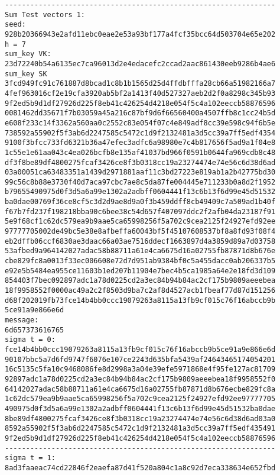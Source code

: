 \documentclass{article}
\begin{document}
 {\footnotesize
 \begin{verbatim}
----------------------------------------------------------------
Sum Test vectors 1:
seed:
928b20366943e2afd11ebc0eae2e53a93bf177a4fcf35bcc64d503704e65e202
h = 7
sum_key VK:
23d72240b54a6135ec7ca96013d2e4edacefc2ccad2aac861430eeb9286b4ae6
sum_key SK
3fcd949fc91c761887d8bcad1c8b1b1565d25d4ffdbfffa28cb66a51982166a7
4fef963016cf2e19cfa3920ab5bf2a1413f40d527327aeb2d2f0a8298c345b93
9f2ed5b9d1df27926d225f8eb41c426254d4218e054f5c4a102eeccb58876596
0081462dd35671f7b03059a45a216c87bf9d6f66560400a4507ffb8c1cc24b5d
e608f233c14f3362a560aa0c2552c83e054f07c4e849adf8cc39e598c94f6b5e
738592a55902f5f3ab6d2247585c5472c1d9f2132481a3d5cc39a7ff5edf4354
9100f3bfcc733fd6321b36a47efec3adfc6a98980e7c4b817656f5ad9a1f04e8
1c55e1e61aa043c4ea026bcfb8e135af41037bd966f0591b0644fa969cdb8c48
df3f8be89df4800275fcaf3426ce8f3b0318cc19a23274474e74e56c6d38d6ad
03a00051ca63483351a1439d2971881aaf11c3bd27223e819ab1a2b42775bd30
99c56c8b88e3730f40d7aca97cbc7ae8c5da87fe004445e711233b0a8d2f1952
b79655490975d0f3d5a6a99e1302a2adbff0604441f13c6b13f6d99e45d51532
ba0dae00769f36ce8cf5c3d2d9ae8d9a0f3b459ddff8cb49409c7a509ad1b40f
f67b7fd237f198218bba90c6bee38c54d657f407097ddc2f2afb04da23187f91
5e9f68cf1c62dc579ea9b9aae5ca65998256f5a702c9cea2125f24927efd92ee
97777705002de49bc5e38e8afbeffa60043bf5f45107608537bf8a8fd93f08f4
eb2dffb06ccf6830ae3daac66a03ae7516ddecf1663897d4a3859d89a7d03758
53afbed9a964142027adac58b88711a61e4ca6675d16a02755fb87871d8b676e
cbe829fc8a0013f33ec006608e72d7d951ab9384bf0c5a455dacc0ab206337b5
e92e5b5484ea955ce11603b1ed207b11904e7bec4b5ca1985a64e2e18fd3d109
854403f7bec092897adc1a78d0225cd2a3ec84b94b84ac2cf175b9809aeeebea
18f9958552f0000ac49a2c2f8503d9ba7c2af8d4527acb1fbeaf77d87d151256
d68f202019fb73fce14b4bb0ccc19079263a8115a13fb9cf015c76f16abccb9b
5ce91a9e866e6d
message:
6d657373616765
sigma t = 0:
fce14b4bb0ccc19079263a8115a13fb9cf015c76f16abccb9b5ce91a9e866e6d
90107bbc5a7d6fd9747f6076e107ce2243d635bfa5439af24643465174054201
16c5135c5fa10c9468086fe8d2998a3a04e39efe5971868e4f95fe127ac81709
92897adc1a78d0225cd2a3ec84b94b84ac2cf175b9809aeeebea18f9958552f0
64142027adac58b88711a61e4ca6675d16a02755fb87871d8b676ecbe829fc8a
1c62dc579ea9b9aae5ca65998256f5a702c9cea2125f24927efd92ee97777705
490975d0f3d5a6a99e1302a2adbff0604441f13c6b13f6d99e45d51532ba0dae
8be89df4800275fcaf3426ce8f3b0318cc19a23274474e74e56c6d38d6ad03a0
8592a55902f5f3ab6d2247585c5472c1d9f2132481a3d5cc39a7ff5edf435491
9f2ed5b9d1df27926d225f8eb41c426254d4218e054f5c4a102eeccb58876596
----------------------------------------------------------------
sigma t = 1:
8ad3faaeac74cd22846f2eaefa87d41f520a804c1a8c92d7eca338634e652fbd

\end{verbatim}}
\end{document}
